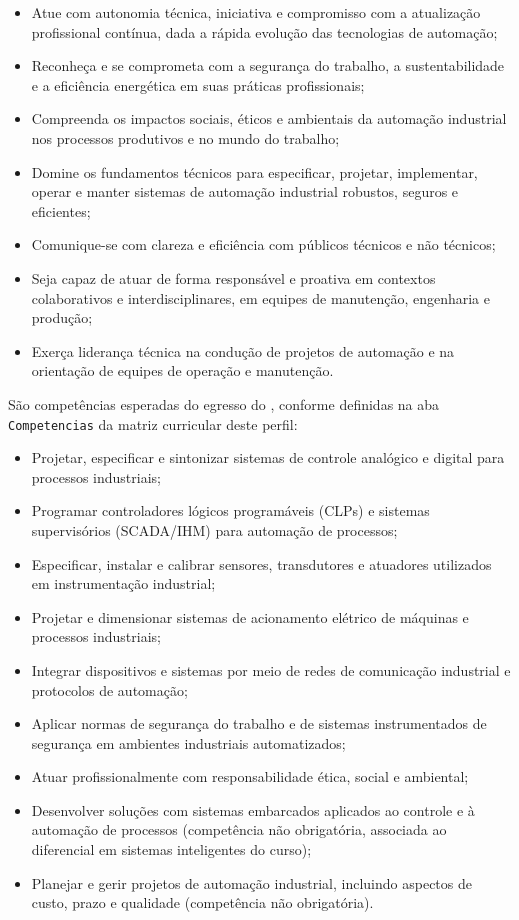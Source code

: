\begin{itemize}
    \item Atue com autonomia técnica, iniciativa e compromisso com a atualização profissional contínua, dada a rápida evolução das tecnologias de automação;
    \item Reconheça e se comprometa com a segurança do trabalho, a sustentabilidade e a eficiência energética em suas práticas profissionais;
    \item Compreenda os impactos sociais, éticos e ambientais da automação industrial nos processos produtivos e no mundo do trabalho;
    \item Domine os fundamentos técnicos para especificar, projetar, implementar, operar e manter sistemas de automação industrial robustos, seguros e eficientes;
    \item Comunique-se com clareza e eficiência com públicos técnicos e não técnicos;
    \item Seja capaz de atuar de forma responsável e proativa em contextos colaborativos e interdisciplinares, em equipes de manutenção, engenharia e produção;
    \item Exerça liderança técnica na condução de projetos de automação e na orientação de equipes de operação e manutenção.
\end{itemize}

São competências esperadas do egresso do \ppccurso, conforme definidas na aba \texttt{Competencias} da matriz curricular deste perfil:

\begin{itemize}
    \item Projetar, especificar e sintonizar sistemas de controle analógico e digital para processos industriais;
    \item Programar controladores lógicos programáveis (CLPs) e sistemas supervisórios (SCADA/IHM) para automação de processos;
    \item Especificar, instalar e calibrar sensores, transdutores e atuadores utilizados em instrumentação industrial;
    \item Projetar e dimensionar sistemas de acionamento elétrico de máquinas e processos industriais;
    \item Integrar dispositivos e sistemas por meio de redes de comunicação industrial e protocolos de automação;
    \item Aplicar normas de segurança do trabalho e de sistemas instrumentados de segurança em ambientes industriais automatizados;
    \item Atuar profissionalmente com responsabilidade ética, social e ambiental;
    \item Desenvolver soluções com sistemas embarcados aplicados ao controle e à automação de processos (competência não obrigatória, associada ao diferencial em sistemas inteligentes do curso);
    \item Planejar e gerir projetos de automação industrial, incluindo aspectos de custo, prazo e qualidade (competência não obrigatória).
\end{itemize}

